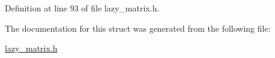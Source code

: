 Definition at line 93 of file lazy\+\_\+matrix.\+h.



The documentation for this struct was generated from the following file\+:\begin{DoxyCompactItemize}
\item 
\mbox{\hyperlink{lazy__matrix_8h}{lazy\+\_\+matrix.\+h}}\end{DoxyCompactItemize}
